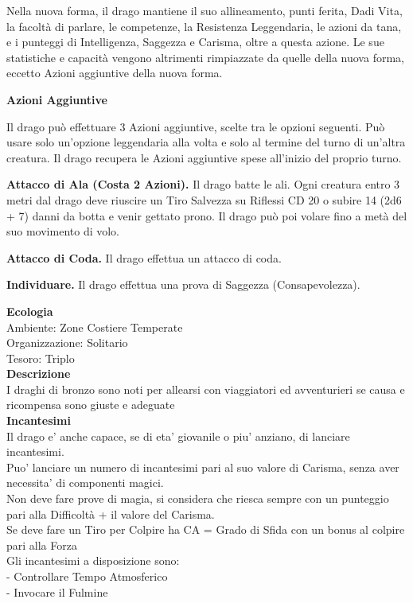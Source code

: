 \begin{multicols}{2}
Nella nuova forma, il drago mantiene il suo allineamento, punti ferita, Dadi Vita, la facoltà di parlare, le competenze, la Resistenza Leggendaria, le azioni da tana, e i punteggi di Intelligenza, Saggezza e Carisma, oltre a questa azione. Le sue statistiche e capacità vengono altrimenti rimpiazzate da quelle della nuova forma, eccetto Azioni aggiuntive della nuova forma.

\textbf{Azioni Aggiuntive}

Il drago può effettuare 3 Azioni aggiuntive, scelte tra le opzioni seguenti. Può usare solo un'opzione leggendaria alla volta e solo al termine del turno di un'altra creatura. Il drago recupera le Azioni aggiuntive spese all'inizio del proprio turno.

\textbf{Attacco di Ala (Costa 2 Azioni).} Il drago batte le ali. Ogni creatura entro 3 metri dal drago deve riuscire un Tiro Salvezza su Riflessi CD 20 o subire 14 (2d6 + 7) danni da botta e venir gettato prono. Il drago può poi volare fino a metà del suo movimento di volo.

\textbf{Attacco di Coda.} Il drago effettua un attacco di coda. 

\textbf{Individuare.} Il drago effettua una prova di Saggezza (Consapevolezza).

\textbf{Ecologia}\\
Ambiente: Zone Costiere Temperate\\
Organizzazione: Solitario\\
Tesoro: Triplo\\
\textbf{Descrizione}\\
I draghi di bronzo sono noti per allearsi con viaggiatori ed avventurieri se causa e ricompensa sono giuste e adeguate\\
\textbf{Incantesimi}\\
Il drago e' anche capace, se di eta' giovanile o piu' anziano, di lanciare incantesimi.\\
Puo' lanciare un numero di incantesimi pari al suo valore di Carisma, senza aver necessita' di componenti magici.\\
Non deve fare prove di magia, si considera che riesca sempre con un punteggio pari alla Difficoltà + il valore del Carisma.\\
Se deve fare un Tiro per Colpire ha CA = Grado di Sfida con un bonus al colpire pari alla Forza\\
Gli incantesimi a disposizione sono:\\
- Controllare Tempo Atmosferico\\
- Invocare il Fulmine\\



\end{multicols}
